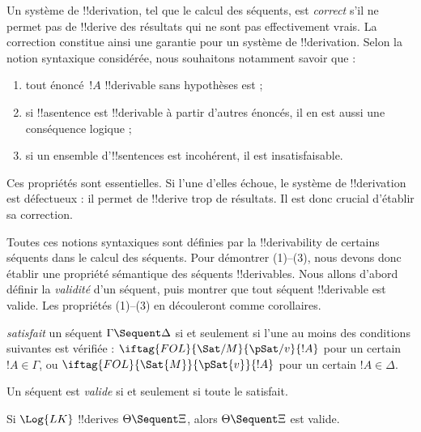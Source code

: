 \documentclass[11pt,a4paper,openany]{memoir}
\begin{document}
\begin{explain}
Un système de !!{derivation}, tel que le calcul des séquents, est
\emph{correct} s'il ne permet pas de !!{derive} des résultats qui
ne sont pas effectivement vrais. La correction constitue ainsi une
garantie pour un système de !!{derivation}. Selon la notion syntaxique
considérée, nous souhaitons notamment savoir que :
\begin{enumerate}
\item tout énoncé~$!A$ !!{derivable} sans hypothèses est
   ;
\item si !!a{sentence} est !!{derivable} à partir d'autres énoncés,
  il en est aussi une conséquence logique ;
\item si un ensemble d'!!{sentence}s est incohérent, il est insatisfaisable.
\end{enumerate}
Ces propriétés sont essentielles. Si l'une d'elles échoue, le système
de !!{derivation} est défectueux : il permet de !!{derive} trop de
résultats. Il est donc crucial d'établir sa correction.

Toutes ces notions syntaxiques sont définies par la !!{derivability}
de certains séquents dans le calcul des séquents. Pour démontrer
(1)--(3), nous devons donc établir une propriété sémantique des
séquents !!{derivable}s. Nous allons d'abord définir la \emph{validité}
d'un séquent, puis montrer que tout séquent !!{derivable} est valide.
Les propriétés (1)--(3) en découleront comme corollaires.
\end{explain}

\begin{defn}
\emph{satisfait} un séquent $\Gamma \Sequent \Delta$ si et seulement
si l'une au moins des conditions suivantes est vérifiée :
$\iftag{FOL}{\Sat/{M}}{\pSat/{v}}{!A}$ pour un certain $!A \in \Gamma$,
ou $\iftag{FOL}{\Sat{M}}{\pSat{v}}{!A}$ pour un certain $!A \in \Delta$.

Un séquent est \emph{valide} si et seulement si toute
le satisfait.
\end{defn}

\begin{thm}[Correction]
Si $\Log{LK}$ !!{derive}s $\Theta \Sequent \Xi$, alors
$\Theta \Sequent \Xi$ est valide.
\end{thm}
\end{document}
